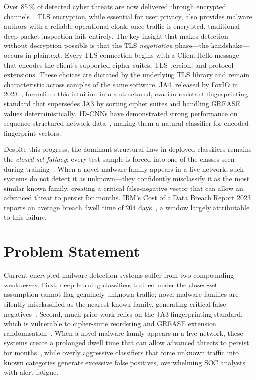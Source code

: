 \documentclass[12pt,a4paper]{report}
\begin{document}
Over 85\,\% of detected cyber threats are now delivered through encrypted
channels~\cite{zscaler2023}. TLS encryption, while essential for user privacy,
also provides malware authors with a reliable operational cloak: once traffic is
encrypted, traditional deep-packet inspection fails entirely. The key insight that
makes detection without decryption possible is that the TLS \textit{negotiation}
phase---the handshake---occurs in plaintext. Every TLS connection begins with a
Client\,Hello message that encodes the client's supported cipher suites, TLS
version, and protocol extensions. These choices are dictated by the underlying TLS
library and remain characteristic across samples of the same software. JA4,
released by FoxIO in 2023~\cite{althouse2023ja4}, formalises this intuition into
a structured, evasion-resistant fingerprinting standard that supersedes JA3 by
sorting cipher suites and handling GREASE values deterministically. 1D-CNNs have
demonstrated strong performance on sequence-structured network data~\cite{wang2017end},
making them a natural classifier for encoded fingerprint vectors.

Despite this progress, the dominant structural flaw in deployed classifiers
remains the \textit{closed-set fallacy}: every test sample is forced into one of
the classes seen during training~\cite{bendale2016openmax}. When a novel malware
family appears in a live network, such systems do not detect it as unknown---they
confidently misclassify it as the most similar known family, creating a critical
false-negative vector that can allow an advanced threat to persist for months.
IBM's Cost of a Data Breach Report 2023 reports an average breach dwell time
of 204 days~\cite{ibm2023breach}, a window largely attributable to this failure.

\section{Problem Statement}

Current encrypted malware detection systems suffer from two compounding weaknesses.
First, deep learning classifiers trained under the closed-set assumption cannot flag
genuinely unknown traffic; novel malware families are silently misclassified as the
nearest known family, generating critical false negatives~\cite{bendale2016openmax,
opensetmalware2023}. Second, much prior work relies on the JA3 fingerprinting
standard, which is vulnerable to cipher-suite reordering and GREASE extension
randomisation~\cite{althouse2023ja4}. When a novel malware family appears in a live
network, these systems create a prolonged dwell time that can allow advanced threats
to persist for months~\cite{ibm2023breach}, while overly aggressive classifiers that
force unknown traffic into known categories generate excessive false positives,
overwhelming SOC analysts with alert fatigue.
\end{document}
